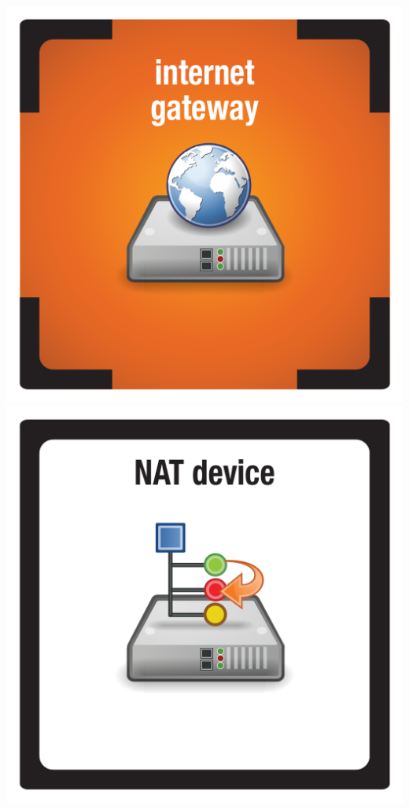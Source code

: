 \documentclass{letter}
\begin{document}
\includegraphics{tiles/node_internet_gateway_compromised}
\includegraphics{tiles/node_nat_device} \\
\end{document}
